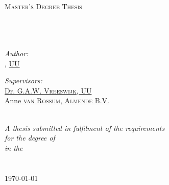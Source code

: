 \documentclass[11pt, a4paper, oneside]{Thesis} %
\begin{document}
\begin{titlepage}
\begin{center}

\textsc{\LARGE \univname}\\[1.5cm] %
\textsc{\Large Master's Degree Thesis}\\[0.5cm] %

\HRule \\[0.4cm] %
{\huge \bfseries \ttitle}\\[0.4cm] %
\HRule \\[1.5cm] %

\begin{minipage}{0.4\textwidth}
\begin{flushleft} \large
\emph{Author:}\\
\href{http://rvlasveld.github.io}{\authornames}, \href{http://www.uu.nl}\textsc{UU} %
\end{flushleft}
\end{minipage}
\begin{minipage}{0.5\textwidth}
\begin{flushright} \large
\emph{Supervisors:} \\
\href{http://www.cs.uu.nl/staff/gv.html}{Dr. G.A.W. \textsc{Vreeswijk}, \href{http://www.uu.nl}\textsc{UU}}  \\ %
\href{http://www.annevanrossum.com}{Anne \textsc{van Rossum}, \href{http://www.almende.com}\textsc{Almende B.V.}} %
\end{flushright}
\end{minipage}\\[3cm]

\large \textit{A thesis submitted in fulfilment of the requirements\\ for the degree of \degreename}\\[0.3cm] %
\textit{in the}\\[0.4cm]
\facname\\\deptname\\[2cm] %

{\large \today}\\[4cm] %

\vfill
\end{center}

\end{titlepage}
\end{document}
